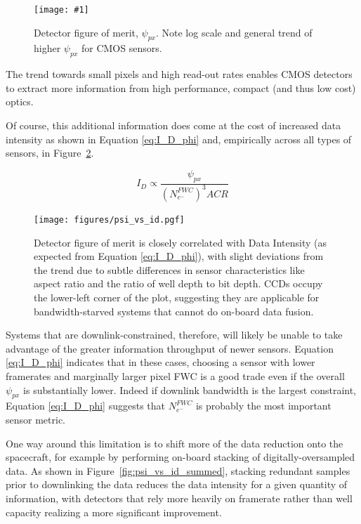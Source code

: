 \documentclass[]{spieman}  %
\newcommand{\includefigure}[3]
{
  \begin{figure}[h!tb]
  \centering
  \texttt{[image: \#1]}
  \caption[]{#3}
  \label{#2}
  \end{figure}
}
\begin{document}
\includefigure{figures/p_kpi.pgf}{fig:psi_px}{Detector figure of merit, $\psi_{px}$.  Note log scale and general trend of higher $\psi_{px}$ for CMOS sensors.}

\begin{observation}
The trend towards small pixels and high read-out rates enables CMOS detectors to extract more information from high performance, compact (and thus low cost) optics.
\end{observation}

Of course, this additional information does come at the cost of increased data intensity as shown in Equation \eqref{eq:I_D_phi} and, empirically across all types of sensors, in Figure~\ref{fig:psi_vs_id}.

\begin{equation}
\label{eq:I_D_phi}
    I_D \propto \frac{\psi_{px}}{\left(N_{e^-}^{FWC}\right)^3 ACR}
\end{equation}

\begin{figure}
  \centering
  \texttt{[image: figures/psi\_vs\_id.pgf]}
  \caption{Detector figure of merit is closely correlated with Data Intensity (as expected from Equation \eqref{eq:I_D_phi}), with slight deviations from the trend due to subtle differences in sensor characteristics like aspect ratio and the ratio of well depth to bit depth. CCDs occupy the lower-left corner of the plot, suggesting they are applicable for bandwidth-starved systems that cannot do on-board data fusion.
  \label{fig:psi_vs_id}}
\end{figure}

Systems that are downlink-constrained, therefore, will likely be unable to take advantage of the greater information throughput of newer sensors. Equation \eqref{eq:I_D_phi}  indicates that in these cases, choosing a sensor with lower framerates and marginally larger pixel FWC is a good trade even if the overall $\psi_{px}$ is substantially lower.  Indeed if downlink bandwidth is the largest constraint, Equation \eqref{eq:I_D_phi} suggests that $N_{e^-}^{FWC}$ is probably the most important sensor metric.

One way around this limitation is to shift more of the data reduction onto the spacecraft, for example by performing on-board stacking of digitally-oversampled data. As shown in Figure~\ref{fig:psi_vs_id_summed}, stacking redundant samples prior to downlinking the data reduces the data intensity for a given quantity of information, with detectors that rely more heavily on framerate rather than well capacity realizing a more significant improvement.
\end{document}
